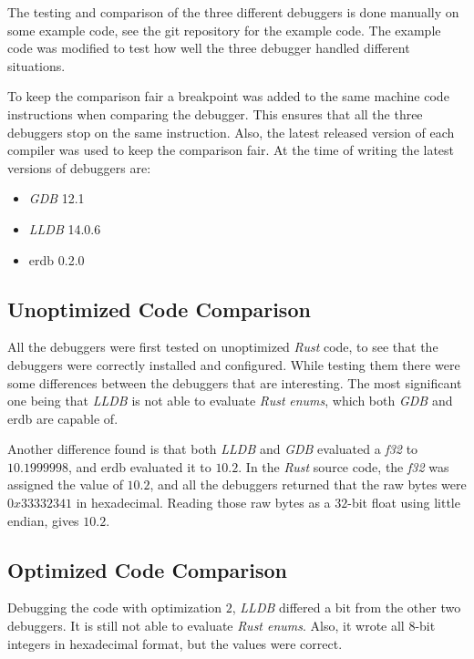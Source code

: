 The testing and comparison of the three different debuggers is done manually on some example code, see the git repository \cite{example-code} for the example code.
The example code was modified to test how well the three debugger handled different situations.

To keep the comparison fair a breakpoint was added to the same machine code instructions when comparing the debugger.
This ensures that all the three debuggers stop on the same instruction.
Also, the latest released version of each compiler was used to keep the comparison fair.
At the time of writing the latest versions of debuggers are:

\begin{itemize}
    \item \emph{GDB} 12.1
    \item \emph{LLDB} 14.0.6
    \item \gls{erdb} 0.2.0 %
\end{itemize}




\subsection{Unoptimized Code Comparison}
All the debuggers were first tested on unoptimized \emph{Rust} code, to see that the debuggers were correctly installed and configured.
While testing them there were some differences between the debuggers that are interesting.
The most significant one being that \emph{LLDB} is not able to evaluate \emph{Rust} \emph{enums}, which both \emph{GDB} and \gls{erdb} are capable of.


Another difference found is that both \emph{LLDB} and \emph{GDB} evaluated a \emph{f32} to $10.1999998$, and \gls{erdb} evaluated it to $10.2$.
In the \emph{Rust} source code, the \emph{f32} was assigned the value of $10.2$, and all the debuggers returned that the raw bytes were $0x33332341$ in hexadecimal.
Reading those raw bytes as a $32$-bit float using little endian, gives $10.2$.



\subsection{Optimized Code Comparison} %
Debugging the code with optimization $2$, \emph{LLDB} differed a bit from the other two debuggers.
It is still not able to evaluate \emph{Rust enums}.
Also, it wrote all $8$-bit integers in hexadecimal format, but the values were correct.


